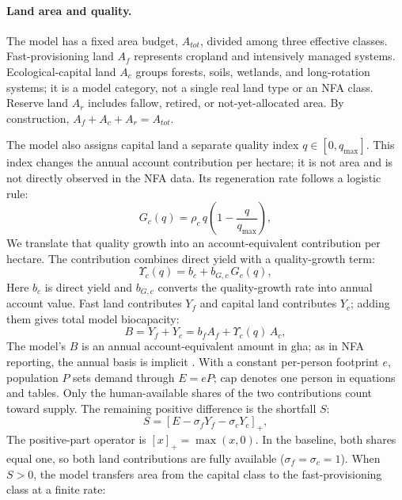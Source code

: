 \documentclass[preprint,12pt,authoryear]{elsarticle}
\newcommand{\pos}[1]{\left[#1\right]_+}
\newcommand{\Ups}{\Upsilon_c}
\begin{document}
\paragraph{Land area and quality.} The model has a fixed area budget, $A_{tot}$, divided among three effective classes. Fast-provisioning land $A_f$ represents cropland and intensively managed systems. Ecological-capital land $A_c$ groups forests, soils, wetlands, and long-rotation systems; it is a model category, not a single real land type or an NFA class. Reserve land $A_r$ includes fallow, retired, or not-yet-allocated area. By construction, $A_f+A_c+A_r=A_{tot}$.

The model also assigns capital land a separate quality index $q\in[0,q_{\max}]$. This index changes the annual account contribution per hectare; it is not area and is not directly observed in the NFA data. Its regeneration rate follows a logistic rule:
\begin{equation}\label{eq:Gc}
G_c(q)=\rho_c\,q\left(1-\frac{q}{q_{\max}}\right),
\end{equation}
We translate that quality growth into an account-equivalent contribution per hectare. The contribution combines direct yield with a quality-growth term:
\begin{equation}\label{eq:Ups}
\Ups(q)=b_c+b_{G,c}\,G_c(q),
\end{equation}
Here $b_c$ is direct yield and $b_{G,c}$ converts the quality-growth rate into annual account value. Fast land contributes $Y_f$ and capital land contributes $Y_c$; adding them gives total model biocapacity:
\begin{equation}\label{eq:B}
B=Y_f+Y_c=b_f A_f+\Ups(q)\,A_c ,
\end{equation}
The model's $B$ is an annual account-equivalent amount in gha; as in NFA reporting, the annual basis is implicit \citep{GFNStandards2009,GFNGuidebook2019}. With a constant per-person footprint $e$, population $P$ sets demand through $E=eP$; $\mathrm{cap}$ denotes one person in equations and tables. Only the human-available shares of the two contributions count toward supply. The remaining positive difference is the shortfall $S$:
\begin{equation}\label{eq:S}
S=\pos{E-\sigma_f Y_f-\sigma_c Y_c},
\end{equation}
The positive-part operator is $\pos{x}=\max(x,0)$. In the baseline, both shares equal one, so both land contributions are fully available ($\sigma_f=\sigma_c=1$). When $S>0$, the model transfers area from the capital class to the fast-provisioning class at a finite rate:
\end{document}
